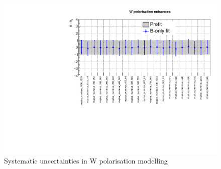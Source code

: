 \clearpage
\begin{figure}[h!]
  \centering
  \caption{Systematic uncertainties in W polarisation modelling}
  \includegraphics[width=0.8\linewidth]{figures/results/36invfb_preapproval/postfit/nuis/WPol_nuisances}
\end{figure}

%
%
%
%
%

